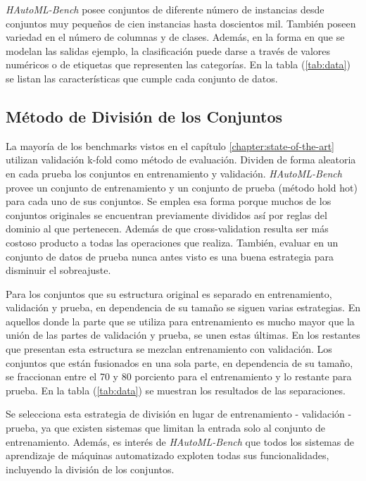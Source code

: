 \textit{HAutoML-Bench} posee conjuntos de diferente número de instancias desde conjuntos muy pequeños de cien instancias hasta doscientos mil. También poseen variedad en el número de columnas y de clases. Además, en la forma en que se 
modelan las salidas ejemplo, la clasificación 
puede darse a través de valores numéricos o de etiquetas que representen las categorías. 
En la tabla (\ref{tab:data}) se listan las características que cumple cada conjunto de datos.

\subsection{Método de División de los Conjuntos}\label{subsection:division}

La mayoría de los benchmarks vistos en el capítulo \ref{chapter:state-of-the-art} utilizan validación k-fold como método de evaluación. Dividen de forma 
aleatoria en cada prueba los conjuntos en entrenamiento y validación. \textit{HAutoML-Bench} provee un conjunto de entrenamiento y un conjunto de prueba 
(método hold hot) para cada uno de sus conjuntos. Se emplea esa forma porque muchos de los conjuntos originales se encuentran previamente divididos así por reglas 
del dominio al que pertenecen. Además de que cross-validation resulta ser más costoso producto a todas las operaciones que realiza. También, evaluar en un 
conjunto de datos de prueba nunca antes visto es una buena estrategia para disminuir el sobreajuste.  

Para los conjuntos que su estructura original es separado en entrenamiento, validación y prueba, en dependencia de su tamaño se siguen varias estrategias. 
En aquellos donde la parte que se utiliza para entrenamiento es mucho mayor que la unión de las partes de validación y prueba, se unen estas últimas.
En los restantes que presentan esta estructura se mezclan entrenamiento con validación. Los conjuntos que están fusionados en una sola parte, en dependencia 
de su tamaño, se fraccionan entre el 70 y 80 porciento para el entrenamiento y lo restante para prueba. En la tabla (\ref{tab:data}) se muestran los resultados de 
las separaciones. 

Se selecciona esta estrategia de división en lugar de entrenamiento - validación - prueba, ya que existen sistemas que limitan la entrada solo al conjunto de 
entrenamiento. Además, es interés de \textit{HAutoML-Bench} que todos los sistemas de aprendizaje de máquinas automatizado exploten todas sus funcionalidades, 
incluyendo la división de los conjuntos.

